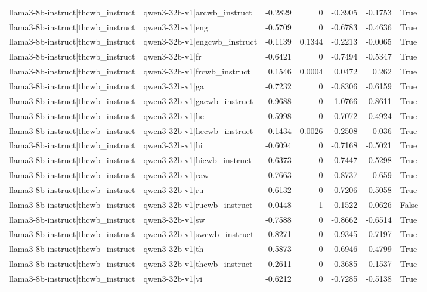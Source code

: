 \begin{table}
\begin{tabular}{l l r r r r l}
llama3-8b-instruct|thcwb_instruct & qwen3-32b-v1|arcwb_instruct & -0.2829 & 0 & -0.3905 & -0.1753 & True \\
llama3-8b-instruct|thcwb_instruct & qwen3-32b-v1|eng & -0.5709 & 0 & -0.6783 & -0.4636 & True \\
llama3-8b-instruct|thcwb_instruct & qwen3-32b-v1|engcwb_instruct & -0.1139 & 0.1344 & -0.2213 & -0.0065 & True \\
llama3-8b-instruct|thcwb_instruct & qwen3-32b-v1|fr & -0.6421 & 0 & -0.7494 & -0.5347 & True \\
llama3-8b-instruct|thcwb_instruct & qwen3-32b-v1|frcwb_instruct & 0.1546 & 0.0004 & 0.0472 & 0.262 & True \\
llama3-8b-instruct|thcwb_instruct & qwen3-32b-v1|ga & -0.7232 & 0 & -0.8306 & -0.6159 & True \\
llama3-8b-instruct|thcwb_instruct & qwen3-32b-v1|gacwb_instruct & -0.9688 & 0 & -1.0766 & -0.8611 & True \\
llama3-8b-instruct|thcwb_instruct & qwen3-32b-v1|he & -0.5998 & 0 & -0.7072 & -0.4924 & True \\
llama3-8b-instruct|thcwb_instruct & qwen3-32b-v1|hecwb_instruct & -0.1434 & 0.0026 & -0.2508 & -0.036 & True \\
llama3-8b-instruct|thcwb_instruct & qwen3-32b-v1|hi & -0.6094 & 0 & -0.7168 & -0.5021 & True \\
llama3-8b-instruct|thcwb_instruct & qwen3-32b-v1|hicwb_instruct & -0.6373 & 0 & -0.7447 & -0.5298 & True \\
llama3-8b-instruct|thcwb_instruct & qwen3-32b-v1|raw & -0.7663 & 0 & -0.8737 & -0.659 & True \\
llama3-8b-instruct|thcwb_instruct & qwen3-32b-v1|ru & -0.6132 & 0 & -0.7206 & -0.5058 & True \\
llama3-8b-instruct|thcwb_instruct & qwen3-32b-v1|rucwb_instruct & -0.0448 & 1 & -0.1522 & 0.0626 & False \\
llama3-8b-instruct|thcwb_instruct & qwen3-32b-v1|sw & -0.7588 & 0 & -0.8662 & -0.6514 & True \\
llama3-8b-instruct|thcwb_instruct & qwen3-32b-v1|swcwb_instruct & -0.8271 & 0 & -0.9345 & -0.7197 & True \\
llama3-8b-instruct|thcwb_instruct & qwen3-32b-v1|th & -0.5873 & 0 & -0.6946 & -0.4799 & True \\
llama3-8b-instruct|thcwb_instruct & qwen3-32b-v1|thcwb_instruct & -0.2611 & 0 & -0.3685 & -0.1537 & True \\
llama3-8b-instruct|thcwb_instruct & qwen3-32b-v1|vi & -0.6212 & 0 & -0.7285 & -0.5138 & True \\

\end{tabular}
\end{table}
